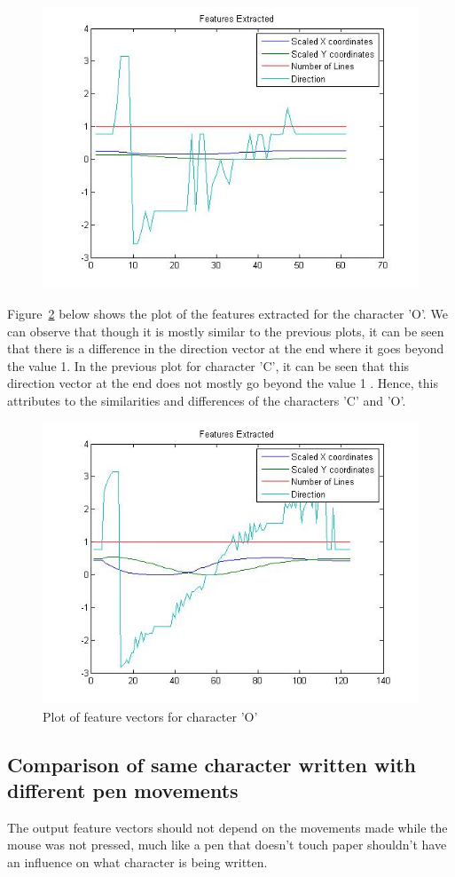 \begin{figure}[H]
\begin{minipage}{.33\textwidth}
		\includegraphics[width=.99\linewidth]{images/deepas/c_verySmall}
		\label{fig:cs3}
	\end{minipage}
\end{figure}

Figure~\ref{fig:o} below shows the plot of the features extracted for the character 'O'. We can observe that though it is mostly similar to the previous plots, it can be seen that there is a difference in the direction vector at the end where it goes beyond the value 1. In the previous plot for character 'C', it can be seen that this direction vector at the end does not mostly go beyond the value 1 . Hence, this attributes to the similarities and differences of the characters 'C' and 'O'.

\begin{figure}[H]
	\centering
	\includegraphics[width=.5\linewidth]{images/deepas/O}
	\caption{Plot of feature vectors for character 'O'}
	\label{fig:o}
\end{figure}

\subsection{Comparison of same character written with different pen movements}
The output feature vectors should not depend on the movements made while the mouse was not pressed, much like a pen that doesn't touch paper shouldn't have an influence on what character is being written.


